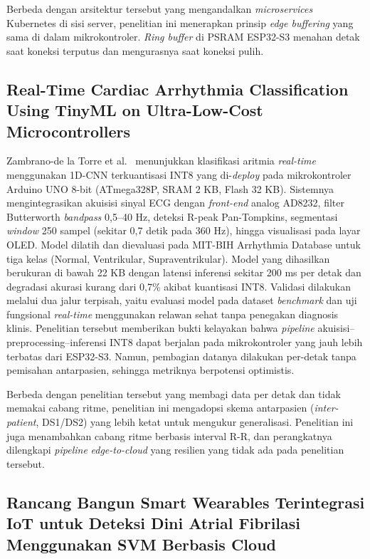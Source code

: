 Berbeda dengan arsitektur tersebut yang mengandalkan \textit{microservices} Kubernetes di sisi server, penelitian ini menerapkan prinsip \textit{edge buffering} yang sama di dalam mikrokontroler. \textit{Ring buffer} di PSRAM ESP32-S3 menahan detak saat koneksi terputus dan mengurasnya saat koneksi pulih.

\subsection{Real-Time Cardiac Arrhythmia Classification Using TinyML on
Ultra-Low-Cost Microcontrollers}

Zambrano-de la Torre et al.~\cite{zambrano_2026} menunjukkan klasifikasi aritmia \emph{real-time} menggunakan
1D-CNN terkuantisasi INT8 yang di-\emph{deploy} pada mikrokontroler Arduino UNO 8-bit
(ATmega328P, SRAM 2 KB, Flash 32 KB). Sistemnya mengintegrasikan akuisisi sinyal ECG
dengan \emph{front-end} analog AD8232, filter Butterworth \emph{bandpass} 0,5--40 Hz,
deteksi R-peak Pan-Tompkins, segmentasi \emph{window} 250 sampel (sekitar 0,7 detik
pada 360 Hz), hingga visualisasi pada layar OLED. Model dilatih dan dievaluasi pada
MIT-BIH Arrhythmia Database untuk tiga kelas (Normal, Ventrikular, Supraventrikular).
Model yang dihasilkan berukuran di bawah 22 KB dengan latensi inferensi sekitar 200 ms
per detak dan degradasi akurasi kurang dari 0,7\% akibat kuantisasi INT8. Validasi
dilakukan melalui dua jalur terpisah, yaitu evaluasi model pada dataset \emph{benchmark}
dan uji fungsional \emph{real-time} menggunakan relawan sehat tanpa penegakan diagnosis
klinis. Penelitian tersebut memberikan bukti kelayakan bahwa \textit{pipeline}
akuisisi--preprocessing--inferensi INT8 dapat berjalan pada mikrokontroler yang
jauh lebih terbatas dari ESP32-S3. Namun, pembagian datanya dilakukan per-detak tanpa
pemisahan antarpasien, sehingga metriknya berpotensi optimistis.

Berbeda dengan penelitian tersebut yang membagi data per detak dan tidak memakai
cabang ritme, penelitian ini mengadopsi skema antarpasien (\emph{inter-patient},
DS1/DS2) yang lebih ketat untuk mengukur generalisasi. Penelitian ini juga menambahkan
cabang ritme berbasis interval R-R, dan perangkatnya dilengkapi \textit{pipeline}
\textit{edge-to-cloud} yang resilien yang tidak ada pada penelitian tersebut.

\subsection{Rancang Bangun Smart Wearables Terintegrasi IoT untuk Deteksi Dini
Atrial Fibrilasi Menggunakan SVM Berbasis Cloud}

